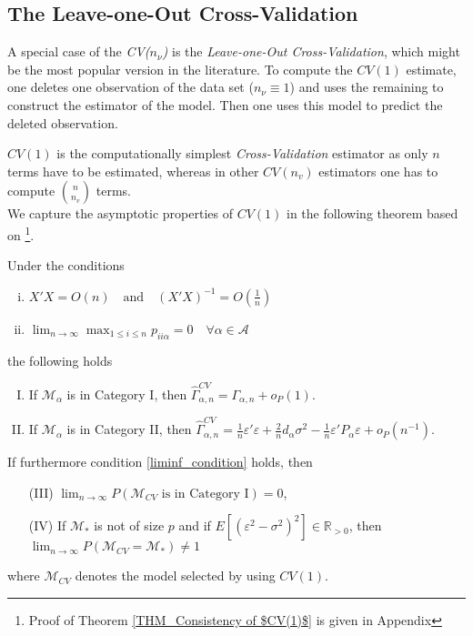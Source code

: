 \documentclass[Research_Module_ES.tex]{subfiles}
\begin{document}
\subsection{The Leave-one-Out Cross-Validation}
A special case of the \textit{CV($n_\nu$)} is the \textit{Leave-one-Out Cross-Validation}, which might be the most popular version in the literature.
To compute the $CV(1)$ estimate, one deletes one observation of the data set ($n_\nu\equiv1$) and uses the remaining to construct the estimator of the model. Then one uses this model to predict the
deleted observation.

$CV(1)$ is the computationally simplest \textit{Cross-Validation} estimator as only $n$ terms have to be estimated, whereas in other $CV(n_v)$ estimators one has to compute $\binom{n}{n_v}$ terms.\\

We capture the asymptotic properties of $CV(1)$ in the following theorem based on \cite{shao}\footnote{Proof of Theorem \ref{THM_Consistency of $CV(1)$} is given in Appendix }.

\begin{thm}
Under the conditions 
\label{THM_Consistency of $CV(1)$}
\begin{enumerate}[(i)]
\item $X'X = O(n) \quad \textrm{and} \quad (X'X)^{-1}=O(\frac{1}{n})$
\item $ \lim_{n \to \infty} \max_{1\le i\le n} p_{ii\alpha} =0 \quad \forall \alpha \in \mathcal{A} $ 
\end{enumerate}
the following holds
\begin{enumerate}[(I)]
\item If $\mathcal{M}_\alpha$ is in Category I, then $\hat{\Gamma}_{\alpha,n}^{CV} = \Gamma_{\alpha,n} + o_P(1)$.
\item If $\mathcal{M}_\alpha$ is in Category II, then $\hat{\Gamma}_{\alpha,n}^{CV} = \frac{1}{n}\varepsilon'\varepsilon + \frac{2}{n}d_\alpha\sigma^2 - \frac{1}{n}\varepsilon'P_\alpha\varepsilon + o_P(n^{-1})$.
\end{enumerate}
If furthermore condition \ref{liminf_condition} holds,
then 
\begin{enumerate}
\item[(III)] $\lim_{n\to\infty} P(\mathcal{M}_{CV}\textrm{ is in Category I})=0$,
\item[(IV)]If $\mathcal{M}_\ast$ is not of size $p$ and if $E[(\varepsilon^2-\sigma^2)^2]\in\mathbb{R}_{>0}$, then \\\mbox{$\lim_{n\to\infty}P(\mathcal{M}_{CV}=\mathcal{M}_\ast) \neq 1$}
\end{enumerate}
where $\mathcal{M}_{CV}$ denotes the model selected by using $CV(1)$.
\end{thm}
\end{document}
